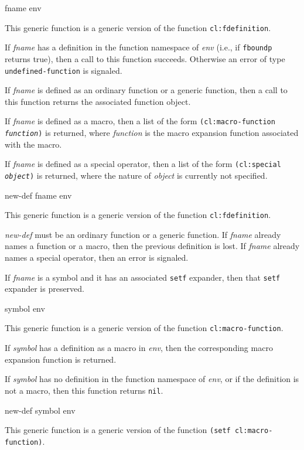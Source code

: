  {fname env}

This generic function is a generic version of the \commonlisp{}
function \texttt{cl:fdefinition}.

If \textit{fname} has a definition in the function namespace of
\textit{env} (i.e., if \texttt{fboundp} returns true), then a call to
this function succeeds.  Otherwise an error of type
\texttt{undefined-function} is signaled.

If \textit{fname} is defined as an ordinary function or a generic
function, then a call to this function returns the associated
function object.

If \textit{fname} is defined as a macro, then a list of the form
\texttt{(cl:macro-function \textrm{\textit{function}})} is returned, where
\textit{function} is the macro expansion function associated with the
macro.

If \textit{fname} is defined as a special operator, then a list of the
form \texttt{(cl:special \textrm{\textit{object}})} is returned, where
  the nature of \textit{object} is currently not specified.

 {new-def fname env}

This generic function is a generic version of the \commonlisp{}
function \texttt{cl:fdefinition}.

\textit{new-def} must be an ordinary function or a generic function.
If \textit{fname} already names a function or a macro, then the
previous definition is lost.  If \textit{fname} already names a
special operator, then an error is signaled.

If \textit{fname} is a symbol and it has an associated \texttt{setf}
expander, then that \texttt{setf} expander is preserved.

 {symbol env}

This generic function is a generic version of the \commonlisp{}
function \texttt{cl:macro-function}.

If \textit{symbol} has a definition as a macro in \textit{env}, then the
corresponding macro expansion function is returned.

If \textit{symbol} has no definition in the function namespace of
\textit{env}, or if the definition is not a macro, then this
function returns \texttt{nil}.


 {new-def symbol env}

This generic function is a generic version of the \commonlisp{}
function \texttt{(setf cl:macro-function)}.

